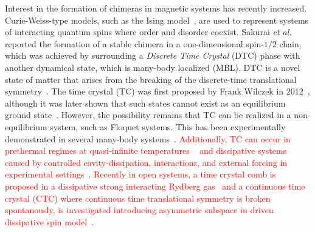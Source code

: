\documentclass[12pt]{iopart}
\newcommand{\red}[1]{\textcolor{red}{#1}}
\begin{document}
Interest in the formation of chimeras in magnetic systems has recently increased. Curie-Weiss-type models, such as the Ising model~\cite{singh_chimera_2011}, are used to represent systems of interacting quantum spins where order and disorder coexist. Sakurai \textit{et al.}~\cite{sakurai_phys_nodate} reported the formation of a stable chimera in a one-dimensional spin-$1/2$ chain, which was achieved by surrounding a \textit{Discrete Time Crystal} (DTC) phase with another dynamical state, which is many-body localized (MBL). DTC is a novel state of matter that arises from the breaking of the discrete-time translational symmetry~\cite{else_floquet_2016}. The time crystal (TC) was first proposed by Frank Wilczek in 2012~\cite{wilczek_quantum_2012}, although it was later shown that such states cannot exist as an equilibrium ground state~\cite{Bruno_comment_1, Bruno2013, watanabe_absence_2015}. However, the possibility remains that TC can be realized in a non-equilibrium system, such as Floquet systems. This has been experimentally demonstrated in several many-body systems~\cite{huang2018,taheri_all-optical_2022, Soham2018, zhang_observation_2017, yao_time_2018,frey_realization_2022, rovny_observation_2018, sacha_time_nodate,golletz_basis_2022}. \red{ Additionally, TC can occur in prethermal regimes at quasi-infinite temperatures ~\cite{Stasiuk2023} and dissipative systems caused by controlled cavity-dissipation, interactions, and external forcing in experimental settings~\cite{Hans2021}. Recently in open systems, a time crystal comb is proposed in a dissipative strong interacting Rydberg gas~\cite{jiao2024} and a continuous time crystal (CTC) where continuous time translational symmetry is broken spontanously,  is investigated introducing asymmetric subspace in driven dissipative spin model~\cite{solanki2024}.}
\end{document}
